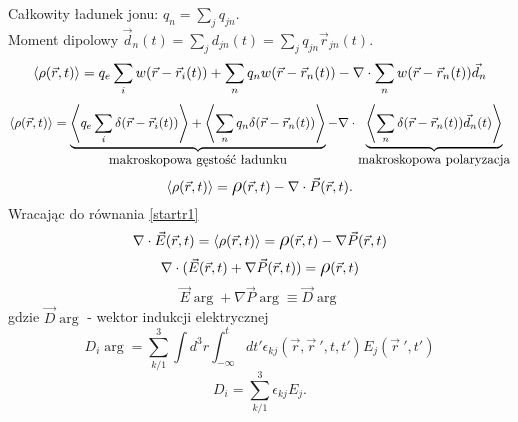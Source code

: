 Całkowity ładunek jonu: $q_n=\sum\limits_j q_{jn}$.\\
Moment dipolowy $\vec{d}_n(t)=\sum\limits_j d_{jn}(t) = 
\sum\limits_j q_{jn}\vec{r}_{jn}(t).$\\
$$\left<  \rho (\vec{r},t)  \right> = q_e\sum_i w(\vec{r}-\vec{r}_i(t))+\sum_n q_n w(\vec{r}-\vec{r}_n(t))-\nabla\cdot
\sum_nw(\vec{r}-\vec{r}_n(t))\vec{d}_n$$
$$\left<  \rho (\vec{r},t)  \right> =\underbrace{\left<  q_e\sum_i \delta(\vec{r}-\vec{r}_i(t)) \right>+\left< \sum_n q_n 
\delta(\vec{r}-\vec{r}_n(t)) \right>}_{\mbox{makroskopowa gęstość ładunku}}-\nabla\cdot
\underbrace{\left< \sum_n\delta(\vec{r}-\vec{r}_n(t))\vec{d}_n(t) \right>}_{\mbox{makroskopowa
polaryzacja}}$$
$$\ave{\rho\arg}=\Brho\arg - \nabla\cdot\vec{P}\arg.$$
Wracając do równania \ref{startr1}
$$\nabla\cdot\vec{E}\arg=\ave{\rho\arg}=\Brho\arg-\nabla\vec{P}\arg$$
$$\nabla\cdot(\vec{E}\arg+\nabla\vec{P}\arg)=\Brho\arg$$
$$ \vec{E}\arg+\nabla\vec{P}\arg\equiv\vec{D}\arg$$
gdzie $\vec{D}\arg$ - wektor indukcji elektrycznej
$$D_i\arg=\sum_{k/1}^{3}\int d^3r\int_{-\infty}^{t}dt'\epsilon_{kj}(\vec{r},
\vec{r}\ ',t,t')E_j(\vec{r}\ ',t')$$
$$D_i=\sum_{k/1}^3\epsilon_{kj}E_j.$$
